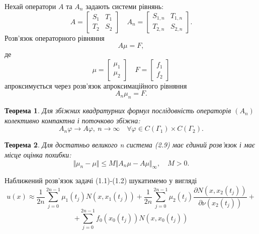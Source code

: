 \documentclass[a4 paper,12pt,ukrainian]{report}
\newtheorem{theorem}{\textbf{Теорема}}[chapter]
\begin{document}
\hspace*{\parindent}Нехай оператори $A$ та $A_{n}$ задають системи рівнянь:
\begin{equation*}
A=\left[
\begin{array}{cc}
S_{1}&T_{1}\\
T_{2}&S_{2}
\end{array}
\right]\quad
A_{n}=\left[
\begin{array}{cc}
S_{1,n}&T_{1,n}\\
T_{2,n}&S_{2,n}
\end{array}
\right].
\end{equation*}
\hspace*{\parindent}Розв'язок операторного рівняння
\begin{equation*}
A\mu=F,
\end{equation*}
де 
\begin{equation*}
\mu=\left[
\begin{array}{c}
\mu_{1}\\
\mu_{2}
\end{array}
\right]\quad
F=\left[
\begin{array}{c}
f_{1}\\
f_{2}
\end{array}
\right]
\end{equation*}
апроксимується через розв'язок апроксимаційного рівняння
\begin{equation*}
A_{n}\mu_{n}=F.
\end{equation*}
\begin{theorem}
Для збіжних квадратурних формул послідовність операторів $(A_{n})$ колективно компактна і поточково збіжна:
\begin{equation*}
A_{n}\varphi\rightarrow A\varphi, \ n\to\infty \quad \forall\varphi\in C(\Gamma_{1})\times C(\Gamma_{2}).
\end{equation*}
\end{theorem}
\begin{theorem}
Для достатньо великого n система (2.9) має єдиний розв'язок і має місце оцінка похибки:
\begin{equation*}
\Vert\mu_{n}-\mu\Vert\le M\Vert A_{n}\mu-A\mu\Vert_{\infty}, \quad M>0.
\end{equation*}
\end{theorem}
\hspace*{\parindent}Наближений розв'язок задачі (1.1)-(1.2) шукатимемо у вигляді
\begin{equation*}
u(x)\approx\frac{1}{2n}\sum\limits_{j=0}^{2n-1}{\mu_1(t_j)N(x,x_1(t_j))}+\frac{1}{2n}\sum\limits_{j=0}^{2n-1}{\mu_2(t_j)\frac{\partial N(x,x_2(t_j))}{\partial\nu(x_2(t_j))}}+
\end{equation*}
\begin{equation*}
+\sum\limits_{j=0}^{2n-1}{f_0(x_0(t_j))N(x,x_0(t_j))}
\end{equation*}
\end{document}
